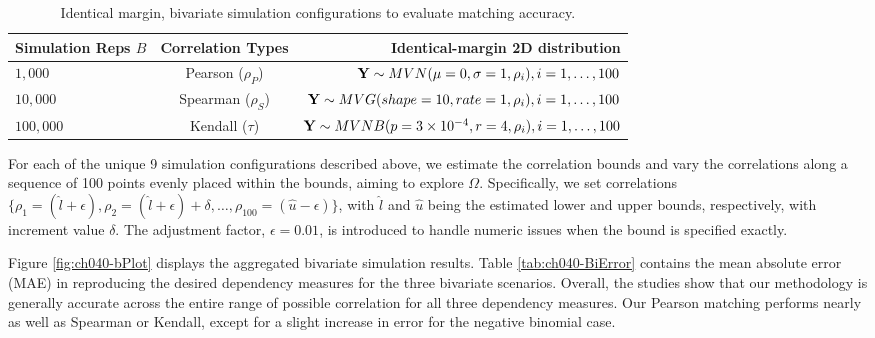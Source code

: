 \documentclass[
]{jss}
\begin{document}
\begin{table}[]
\centering
\caption{ \label{tab:sims} Identical margin, bivariate simulation configurations to evaluate matching accuracy.}
\begin{tabular}{@{}lcr@{}}
\toprule
Simulation Reps $B$ & Correlation Types & Identical-margin 2D distribution \\ \midrule
$1,000$ & Pearson ($\rho_P$) & ${\bf Y} \sim MVN( \mu= 0 , \sigma = 1, \rho_i ), i=1,\ldots,100$ \\
$10,000$ & Spearman ($\rho_S$) & ${\bf Y} \sim MVG( shape = 10, rate = 1, \rho_i ), i=1,\ldots,100$ \\
$100,000$ & Kendall ($\tau$) & ${\bf Y} \sim MVNB(p = 3\times10^{-4}, r = 4,\rho_i), i=1,\ldots,100$ \\ \bottomrule
\end{tabular}
\end{table}

For each of the unique 9 simulation configurations described above, we estimate the correlation bounds and vary the correlations along a sequence of 100 points evenly placed within the bounds, aiming to explore \(\Omega\). Specifically, we set correlations \(\{ \rho_1 = ( \hat{l} + \epsilon), \rho_2 = (\hat{l} + \epsilon) + \delta, \ldots, \rho_{100} = (\hat{u} - \epsilon) \}\), with \(\hat{l}\) and \(\hat{u}\) being the estimated lower and upper bounds, respectively, with increment value \(\delta\). The adjustment factor, \(\epsilon=0.01\), is introduced to handle numeric issues when the bound is specified exactly.

Figure \ref{fig:ch040-bPlot} displays the aggregated bivariate simulation results. Table \ref{tab:ch040-BiError} contains the mean absolute error (MAE) in reproducing the desired dependency measures for the three bivariate scenarios. Overall, the studies show that our methodology is generally accurate across the entire range of possible correlation for all three dependency measures. Our Pearson matching performs nearly as well as Spearman or Kendall, except for a slight increase in error for the negative binomial case.
\end{document}

